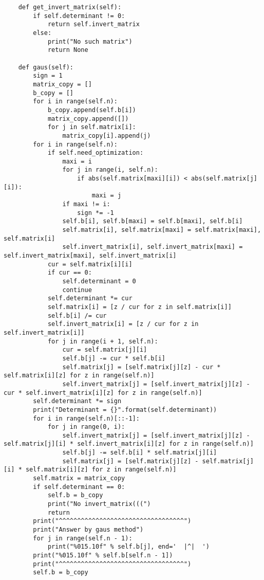 \documentclass[a4paper,12pt,titlepage,finall]{article}
\begin{document}
\begin{lstlisting}
    def get_invert_matrix(self):
        if self.determinant != 0:
            return self.invert_matrix
        else:
            print("No such matrix")
            return None

    def gaus(self):
        sign = 1
        matrix_copy = []
        b_copy = []
        for i in range(self.n):
            b_copy.append(self.b[i])
            matrix_copy.append([])
            for j in self.matrix[i]:
                matrix_copy[i].append(j)
        for i in range(self.n):
            if self.need_optimization:
                maxi = i
                for j in range(i, self.n):
                    if abs(self.matrix[maxi][i]) < abs(self.matrix[j][i]):
                        maxi = j
                if maxi != i:
                    sign *= -1
                self.b[i], self.b[maxi] = self.b[maxi], self.b[i]
                self.matrix[i], self.matrix[maxi] = self.matrix[maxi], self.matrix[i]
                self.invert_matrix[i], self.invert_matrix[maxi] = self.invert_matrix[maxi], self.invert_matrix[i]
            cur = self.matrix[i][i]
            if cur == 0:
                self.determinant = 0
                continue
            self.determinant *= cur
            self.matrix[i] = [z / cur for z in self.matrix[i]]
            self.b[i] /= cur
            self.invert_matrix[i] = [z / cur for z in self.invert_matrix[i]]
            for j in range(i + 1, self.n):
                cur = self.matrix[j][i]
                self.b[j] -= cur * self.b[i]
                self.matrix[j] = [self.matrix[j][z] - cur * self.matrix[i][z] for z in range(self.n)]
                self.invert_matrix[j] = [self.invert_matrix[j][z] - cur * self.invert_matrix[i][z] for z in range(self.n)]
        self.determinant *= sign
        print("Determinant = {}".format(self.determinant))
        for i in range(self.n)[::-1]:
            for j in range(0, i):
                self.invert_matrix[j] = [self.invert_matrix[j][z] - self.matrix[j][i] * self.invert_matrix[i][z] for z in range(self.n)]
                self.b[j] -= self.b[i] * self.matrix[j][i]
                self.matrix[j] = [self.matrix[j][z] - self.matrix[j][i] * self.matrix[i][z] for z in range(self.n)]
        self.matrix = matrix_copy
        if self.determinant == 0:
            self.b = b_copy
            print("No invert_matrix(((")
            return
        print("^^^^^^^^^^^^^^^^^^^^^^^^^^^^^^^^^^")
        print("Answer by gaus method")
        for j in range(self.n - 1):
            print("%015.10f" % self.b[j], end='  |^|  ')
        print("%015.10f" % self.b[self.n - 1])
        print("^^^^^^^^^^^^^^^^^^^^^^^^^^^^^^^^^^")
        self.b = b_copy


\end{lstlisting}
\end{document}

